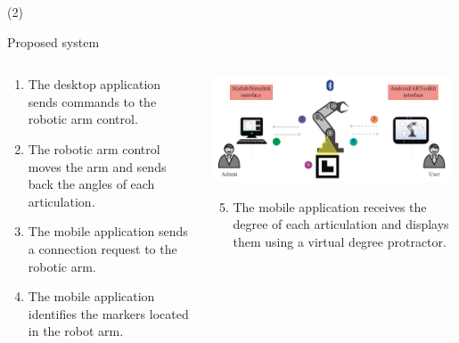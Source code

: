 \begin{frame}{ (2)}
\begin{block}{Proposed system} 
\begin{columns}
\begin{column}{0.5\textwidth}
\begin{enumerate}
\item The desktop application sends commands to the robotic arm control.  
\item The robotic arm control moves the arm and sends back the angles of each articulation.  
\item The mobile application sends a connection request to the robotic arm.   
\item The mobile application identifies the markers located in the robot arm.  

\end{enumerate}
\end{column}
\begin{column}{0.5\textwidth}
\begin{center}
     \includegraphics[width=0.98\textwidth]{Figs/SistemaAR_Maestria1}
     \end{center}
     \begin{enumerate}
     \setcounter{enumi}{4}
     \item The mobile application receives the degree of each articulation and displays them using a virtual degree protractor.
     
     \end{enumerate}
     
     \end{column}
     \end{columns}
\end{block}
\end{frame} 

